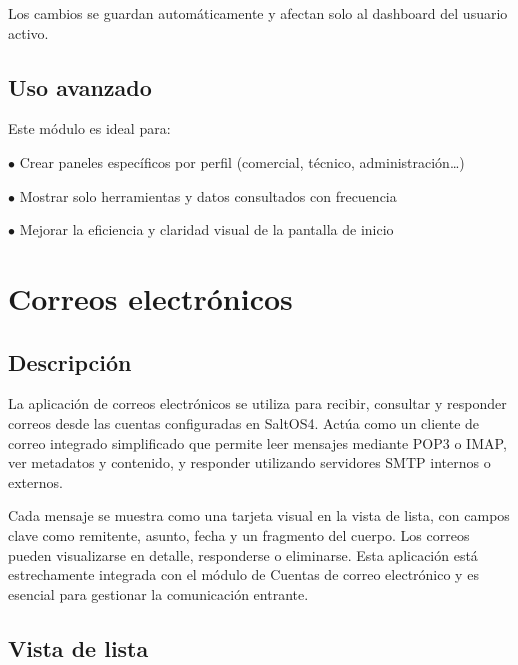 \documentclass[a4paper]{article}
\begin{document}
Los cambios se guardan automáticamente y afectan solo al dashboard del usuario activo.

\hypertarget{toc89}{}
\subsection{Uso avanzado}

Este módulo es ideal para:

\begin{compactitem}
\item[\color{myblue}$\bullet$] Crear paneles específicos por perfil (comercial, técnico, administración…)
\item[\color{myblue}$\bullet$] Mostrar solo herramientas y datos consultados con frecuencia
\item[\color{myblue}$\bullet$] Mejorar la eficiencia y claridad visual de la pantalla de inicio
\end{compactitem}


\hypertarget{toc90}{}
\section{Correos electrónicos}

\hypertarget{toc91}{}
\subsection{Descripción}

La aplicación de correos electrónicos se utiliza para recibir, consultar y responder correos desde las cuentas configuradas en SaltOS4.
Actúa como un cliente de correo integrado simplificado que permite leer mensajes mediante POP3 o IMAP,
ver metadatos y contenido, y responder utilizando servidores SMTP internos o externos.

Cada mensaje se muestra como una tarjeta visual en la vista de lista, con campos clave como remitente, asunto,
fecha y un fragmento del cuerpo. Los correos pueden visualizarse en detalle, responderse o eliminarse. Esta aplicación
está estrechamente integrada con el módulo de Cuentas de correo electrónico y es esencial para gestionar la comunicación entrante.

\hypertarget{toc92}{}
\subsection{Vista de lista}
\end{document}
